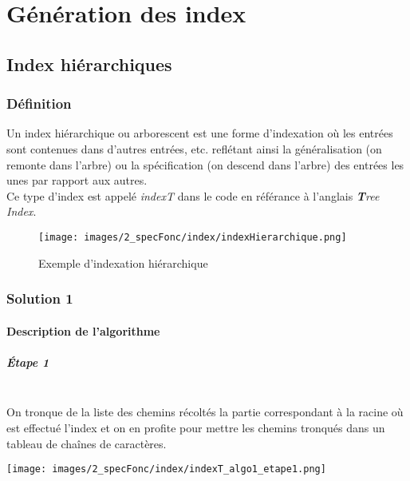 \documentclass[./standalone.tex]{subfiles}
\begin{document}
\chapter{Génération des index}

\section{Index hiérarchiques}

\subsection{Définition}
Un index hiérarchique ou arborescent est une forme d'indexation où les entrées sont contenues dans d'autres entrées, etc. reflétant ainsi la généralisation (on remonte dans l'arbre) ou la spécification (on descend dans l'arbre) des entrées les unes par rapport aux autres.\\

Ce type d'index est appelé \textit{indexT} dans le code en référance à l'anglais \textit{\textbf{T}ree Index}.\\

\begin{figure}[h!]
    \centering
    \texttt{[image: images/2\_specFonc/index/indexHierarchique.png]}
    \caption{Exemple d'indexation hiérarchique}
    \label{fig:indexT}
\end{figure}

\newpage
\subsection{Solution 1}
\bigskip
\bigskip
\subsubsection{Description de l'algorithme\\}
\paragraph{Étape 1\\\\}
On tronque de la liste des chemins récoltés la partie correspondant à la racine où est effectué l'index et on en profite pour mettre les chemins tronqués dans un tableau de chaînes de caractères.\\

\begin{center}
\texttt{[image: images/2\_specFonc/index/indexT\_algo1\_etape1.png]}
\label{fig:indexT_algo1_etape1}
\end{center}
\end{document}
